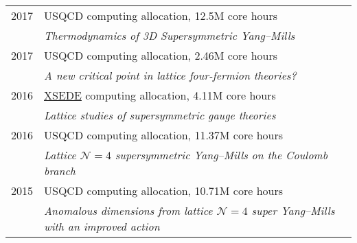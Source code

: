 \begin{spacelistout}
\begin{tabular}[t]{cl}
      2017 & USQCD computing allocation, 12.5M core hours                                                                                                                                                                              \\ %
           & \textit{Thermodynamics of 3D Supersymmetric Yang--Mills}                                                                                                                                                                  \\[6 pt]
      2017 & USQCD computing allocation, 2.46M core hours                                                                                                                                                                              \\ %
           & \textit{A new critical point in lattice four-fermion theories?}                                                                                                                                                           \\[6 pt]
      2016 & \href{http://www.xsede.org}{XSEDE} computing allocation, 4.11M core hours                                                                                                                                                 \\ %
           & \textit{Lattice studies of supersymmetric gauge theories}                                                                                                                                                                 \\[6 pt]
      2016 & USQCD computing allocation, 11.37M core hours                                                                                                                                                                             \\ %
           & \textit{Lattice $\mathcal N = 4$ supersymmetric Yang--Mills on the Coulomb branch}                                                                                                                                        \\[6 pt]
      2015 & USQCD computing allocation, 10.71M core hours                                                                                                                                                                             \\ %
           & \textit{Anomalous dimensions from lattice $\mathcal N = 4$ super Yang--Mills with an improved action}                                                                                                                     \\[6 pt]

\end{tabular}
\end{spacelistout}
